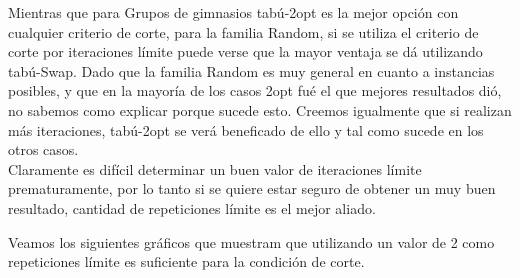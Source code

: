 \begin{figure}[h] 
 \centering
       \label{fig:randomDist1}
    \label{fig:randomMejora1}
\end{figure}

\newpage

Mientras que para Grupos de gimnasios tabú-2opt es la mejor opción con cualquier criterio de corte, para la familia Random, si se utiliza el criterio de corte por iteraciones límite puede verse que la mayor ventaja se dá utilizando tabú-Swap.
Dado que la familia Random es muy general en cuanto a instancias posibles, y que en la mayoría de los casos 2opt fué el que mejores resultados dió, no sabemos como explicar porque sucede esto. 
Creemos igualmente que si realizan más iteraciones,  tabú-2opt se verá beneficado de ello y tal como sucede en los otros casos.\\

Claramente es difícil determinar un buen valor de iteraciones límite prematuramente, por lo tanto si se quiere estar seguro de obtener un muy buen resultado, cantidad de repeticiones límite es el mejor aliado.

Veamos los siguientes gráficos que muestram que utilizando un valor de 2 como repeticiones límite es suficiente para la condición de corte.

